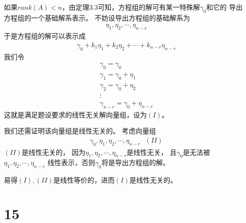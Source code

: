 \documentclass{article}
\begin{document}
如果$rank(A) < n$，由定理3.3可知，方程组的解可有某一特殊解$\gamma_0$和它的
导出方程组的一个基础解系表示。
不妨设导出方程组的基础解系为
\begin{align*}
  \eta_1, \eta_2, \cdots, \eta_{n - r}
\end{align*}
于是方程组的解可以表示成
\begin{align*}
  \gamma_0 + k_1 \eta_1 + k_2 \eta_2 + \cdots + k_{n - r} \eta_{n - r}
\end{align*}
我们令
\begin{align*}
  \gamma_0 = \gamma_0          \\
  \gamma_1 = \gamma_0 + \eta_1 \\
  \gamma_2 = \gamma_0 + \eta_2 \\
  \vdots                       \\
  \gamma_{n - r} = \gamma_0 + \eta_{n - r}
\end{align*}
这就是满足题设要求的线性无关解向量组，设为$(I)$。

我们还需证明该向量组是线性无关的。
考虑向量组
\begin{align*}
  \gamma_0, \eta_1, \eta_2, \cdots, \eta_{n - r} \ \ \ (II)
\end{align*}
$(II)$是线性无关的，
因为$\eta_1, \eta_2, \cdots, \eta_{n - r}$是线性无关，
且$\gamma_0$是无法被$\eta_1, \eta_2, \cdots, \eta_{n - r}$
线性表示，否则$\gamma_0$将是导出方程组的解。

易得$(I), (II)$是线性等价的，进而$(I)$是线性无关的。

\section*{15}
\end{document}
